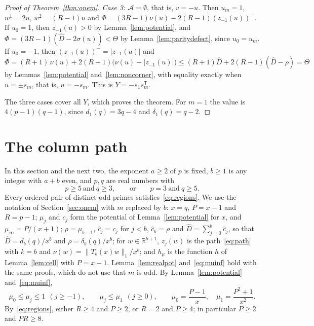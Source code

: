 \documentclass[11pt]{article}
\theoremstyle{remark}
\begin{document}
\begin{proof}[Proof of Theorem~\ref{thm:onem}]
\emph{Case 3: $\mathcal A=\emptyset$}, that is, $v=-u$. Then $u_m=1$,
$w^1=2u$, $w^2=(R-1)u$ and $\Phi=(3R-1)\nu(u)-2(R-1)(z_{-1}(u))^-$. If
$u_0=1$, then $z_{-1}(u)>0$ by Lemma~\ref{lem:potential}, and
$\Phi=(3R-1)(\hat D-2\sigma(u))<\Theta$ by Lemma~\ref{lem:paritydefect},
since $u_0=u_m$. If $u_0=-1$, then $(z_{-1}(u))^-=|z_{-1}(u)|$ and
\[
\Phi=(R+1)\,\nu(u)+2(R-1)\bigl(\nu(u)-|z_{-1}(u)|\bigr)
\le(R+1)\hat D+2(R-1)(\hat D-\rho)=\Theta
\]
by Lemmas~\ref{lem:potential} and~\ref{lem:noncorner}, with equality exactly
when $u=\pm s_m$, that is, $u=-s_m$. This is $Y=-s_1s_m^{\mathsf T}$.

The three cases cover all $Y$, which proves the theorem. For $m=1$ the value
is $4(p-1)(q-1)$, since $d_1(q)=3q-4$ and $\delta_1(q)=q-2$.
\end{proof}

\section{The column path}\label{sec:column}
In this section and the next two, the exponent $a\ge2$ of $p$ is fixed, $b\ge1$
is any integer with $a+b$ even, and $p,q$ are real numbers with
\begin{equation}\label{eq:regions}
p\ge5\ \text{and}\ q\ge3,\qquad\text{or}\qquad p=3\ \text{and}\ q\ge5.
\end{equation}
Every ordered pair of distinct odd primes satisfies~\eqref{eq:regions}. We use
the notation of Section~\ref{sec:onem} with $m$ replaced by $b$: $x=q$,
$P=x-1$ and $R=p-1$; $\mu_j$ and $c_j$ form the potential of
Lemma~\ref{lem:potential} for $x$, and $\mu_\infty=P/(x+1)$; $\rho=\mu_{b-1}$,
$\hat c_j=c_j$ for $j<b$, $\hat c_b=\rho$ and $\hat D=\sum_{j=0}^b\hat c_j$,
so that $\hat D=d_b(q)/x^b$ and $\rho=\delta_b(q)/x^b$; for
$w\in\mathbb R^{b+1}$, $z_j(w)$ is the path~\eqref{eq:path} with $k=b$ and
$\nu(w)=\|T_b(x)w\|_1/x^b$; and $h_\mu$ is the function $h$ of
Lemma~\ref{lem:cell} with $P=x-1$. Lemma~\ref{lem:realpot}
and~\eqref{eq:muinf} hold with the same proofs, which do not use that $m$ is
odd. By Lemma~\ref{lem:potential} and~\eqref{eq:muinf},
\begin{equation}\label{eq:murange}
\mu_0\le\mu_j\le1\ \ (j\ge-1),\qquad \mu_j\le\mu_1\ \ (j\ge0),\qquad
\mu_0=\frac{P-1}{x},\quad \mu_1=\frac{P^2+1}{x^2}.
\end{equation}
By~\eqref{eq:regions}, either $R\ge4$ and $P\ge2$, or $R=2$ and $P\ge4$; in
particular $P\ge2$ and $PR\ge8$.
\end{document}
